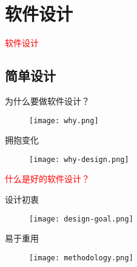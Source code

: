 \section{软件设计}
\label{sec:introduction}

\begin{frame}
  \begin{center}
    \Huge{\textcolor{red}{软件设计}}
  \end{center}
\end{frame}

\subsection{简单设计}

\begin{frame}{为什么要做软件设计？}
  \begin{figure}
    \centering
    \texttt{[image: why.png]}
  \end{figure}
\end{frame}

\begin{frame}{拥抱变化}
  \begin{figure}
    \centering
    \texttt{[image: why-design.png]}
  \end{figure}
\end{frame}

\begin{frame}
  \begin{center}
    \huge{\textcolor{red}{什么是好的软件设计？}}
  \end{center}
\end{frame}

\begin{frame}{设计初衷}
  \begin{figure}
    \centering
    \texttt{[image: design-goal.png]}
  \end{figure}
\end{frame}

\begin{frame}{易于重用}
  \begin{figure}
    \centering
    \texttt{[image: methodology.png]}
  \end{figure}
\end{frame}

